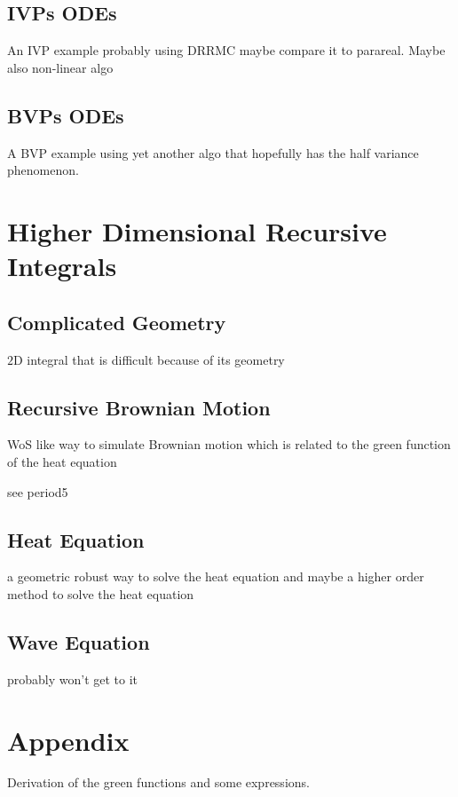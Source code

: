 \documentclass[a4paper,12pt]{article}
\begin{document}
\subsection{IVPs ODEs}
An IVP example probably using DRRMC maybe compare it to parareal. Maybe also non-linear algo

\subsection{BVPs ODEs}
A BVP example using yet another algo that hopefully has the half variance phenomenon.

\section{Higher Dimensional Recursive Integrals}
\subsection{Complicated Geometry}
\begin{example}
    $2$D integral that is difficult because of its geometry
\end{example}

\subsection{Recursive Brownian Motion}
WoS like way to simulate Brownian motion which is related to the green function
of the heat equation

\begin{example}
    see period5
\end{example}

\subsection{Heat Equation}
a geometric robust way to solve the heat equation and maybe a higher order method to solve
the heat equation

\subsection{Wave Equation}
probably won't get to it

\newpage
\printbibliography
\newpage

\section{Appendix}
Derivation of the green functions and some expressions.
\end{document}
